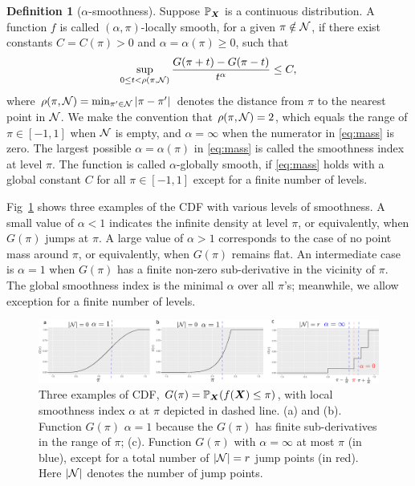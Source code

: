 \documentclass[aos]{imsart}
\theoremstyle{definition}
\newtheorem{definition}{Definition}
\begin{document}
\begin{definition} [$\alpha$-smoothness] \label{ass:decboundary} 
Suppose $\mathbb{P}_{\bm X}$ is a continuous distribution. A function $f$ is called $(\alpha,\pi)$-locally smooth, for a given $\pi \notin \mathcal{N}$, if there exist constants $C=C(\pi)>0$ and $\alpha=\alpha(\pi)\geq 0$, such that
\begin{equation}\label{eq:mass}
\sup_{0\leq t<\rho(\pi, \tN)}{G(\pi+t)-G(\pi-t)\over t^{\alpha}}\leq C,
\end{equation}
where $\rho(\pi,\mathcal{N}) = \min_{\pi'\in \mathcal{N}} |\pi-\pi'|$ denotes the distance from $\pi$ to the nearest point in $\mathcal{N}$. We make the convention that $\rho(\pi,\mathcal{N})=2$, which equals the range of $\pi\in[-1,1]$ when $\mathcal{N}$ is empty, and $\alpha=\infty$ when the numerator in \eqref{eq:mass} is zero. The largest possible $\alpha=\alpha(\pi)$ in \eqref{eq:mass} is called the smoothness index at level $\pi$. The function is called $\alpha$-globally smooth, if \eqref{eq:mass} holds with a global constant $C$ for all $\pi\in[-1,1]$ except for a finite number of levels.
\end{definition}

\noindent
Fig~\ref{fig:CDF} shows three examples of the CDF with various levels of smoothness. A small value of $\alpha<1$ indicates the infinite density at level $\pi$, or equivalently, when $G(\pi)$ jumps at $\pi$. A large value of $\alpha>1$ corresponds to the case of no point mass around $\pi$, or equivalently, when $G(\pi)$ remains flat. An intermediate case is $\alpha=1$ when $G(\pi)$ has a finite non-zero sub-derivative in the vicinity of $\pi$. The global smoothness index is the minimal $\alpha$ over all $\pi$'s; meanwhile, we allow exception for a finite number of levels. 

\begin{figure}
\includegraphics[width=.95\textwidth]{figure/cdf_new.pdf}
\caption{Three examples of CDF, $G(\pi)=\mathbb{P}_{\bm X}(f(\bm X)\leq \pi)$, with local smoothness index $\alpha$ at $\pi$ depicted in dashed line. (a) and (b). Function $G(\pi)$ $\alpha=1$ because the $G(\pi)$ has finite sub-derivatives in the range of $\pi$; (c). Function $G(\pi)$ with $\alpha=\infty$ at most $\pi$ (in blue), except for a total number of $|\mathcal{N}|=r$ jump points (in red). Here $|\mathcal{N}|$ denotes the number of jump points.}
\label{fig:CDF}
\end{figure}
\end{document}
